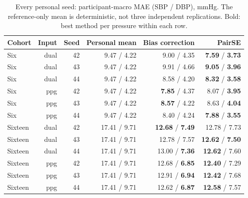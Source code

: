 \begin{table}[t]
\centering\caption{Every personal seed: participant-macro MAE (SBP / DBP), mmHg. The reference-only mean is deterministic, not three independent replications. Bold: best method per pressure within each row.}\label{tab:seeds}
\footnotesize
\setlength{\tabcolsep}{4pt}
\begin{tabular}{lrrrrr}\toprule
Cohort & Input & Seed & Personal mean & Bias correction & PairSE\\\midrule
Six & dual & 42 & 9.47 / 4.22 & 9.00 / 4.35 & \textbf{7.59} / \textbf{3.73}\\
Six & dual & 43 & 9.47 / 4.22 & 9.91 / 4.66 & \textbf{9.05} / \textbf{3.96}\\
Six & dual & 44 & 9.47 / 4.22 & 8.58 / 4.20 & \textbf{8.32} / \textbf{3.58}\\
Six & ppg & 42 & 9.47 / 4.22 & \textbf{7.85} / 4.37 & 8.07 / \textbf{3.95}\\
Six & ppg & 43 & 9.47 / 4.22 & \textbf{8.57} / 4.22 & 8.63 / \textbf{4.04}\\
Six & ppg & 44 & 9.47 / 4.22 & 8.40 / 4.24 & \textbf{7.88} / \textbf{3.55}\\
Sixteen & dual & 42 & 17.41 / 9.71 & \textbf{12.68} / \textbf{7.49} & 12.78 / 7.73\\
Sixteen & dual & 43 & 17.41 / 9.71 & 12.78 / 7.57 & \textbf{12.62} / \textbf{7.50}\\
Sixteen & dual & 44 & 17.41 / 9.71 & 13.00 / \textbf{7.36} & \textbf{12.62} / 7.60\\
Sixteen & ppg & 42 & 17.41 / 9.71 & 12.68 / \textbf{6.85} & \textbf{12.40} / 7.29\\
Sixteen & ppg & 43 & 17.41 / 9.71 & 12.91 / \textbf{6.94} & \textbf{12.42} / 7.68\\
Sixteen & ppg & 44 & 17.41 / 9.71 & 12.62 / \textbf{6.87} & \textbf{12.58} / 7.57\\
\bottomrule\end{tabular}
\end{table}
